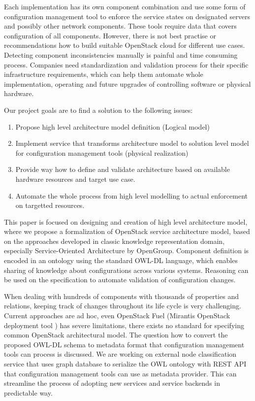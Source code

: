 Each implementation has its own component combination and use some form of configuration management tool to enforce the service states on designated servers and possibly other network components. These tools require data that covers configuration of all components. However, there is not best practise or recommendations how to build suitable OpenStack cloud for different use cases. Detecting component inconsistencies manually is painful and time consuming process.
Companies need standardization and validation process for their specific infrastructure requirements, which can help them automate whole implementation, operating and future upgrades of controlling software or physical hardware. 

Our project goals are to find a solution to the following issues:

\begin{enumerate}
 \item Propose high level architecture model definition (Logical model)
 \item Implement service that transforms architecture model to solution level model for configuration management tools (physical realization)
 \item Provide way how to define and validate architecture based on available hardware resources and target use case.
 \item Automate the whole process from high level modelling to actual enforcement on targetted resources.
\end{enumerate}

This paper is focused on designing and creation of high level architecture model, where we propose a formalization of OpenStack service architecture model, based on the approaches developed in classic knowledge representation domain, especially Service-Oriented Architecture by OpenGroup. Component definition is encoded in an ontology using the standard OWL-DL language, which enables sharing of knowledge about configurations across various systems. Reasoning can be used on the specification to automate validation of configuration changes.

When dealing with hundreds of components with thousands of properties and relations, keeping track of changes throughout its life cycle is very challenging. Current approaches are ad hoc, even OpenStack Fuel (Mirantis OpenStack deployment tool \cite{fuel}) has severe limitations, there exists no standard for specifying common OpenStack architectural model. The question how to convert the proposed OWL-DL schema to metadata format that configuration management tools can process is discussed. We are working on external node classification service that uses graph database to serialize the OWL ontology with REST API that configuration management tools can use as metadata provider. This can streamline the process of adopting new services and service backends in predictable way.

